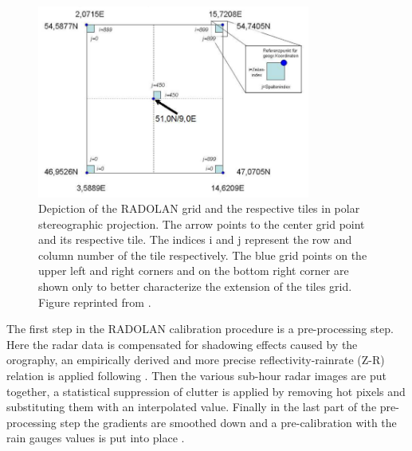 \begin{figure}[h!]
    \centering
    \includegraphics[width=0.8\textwidth]{grid.png}
    \caption{Depiction of the RADOLAN grid and the respective tiles in polar stereographic projection. The arrow points to the center grid point and its respective tile. The indices i and j represent the row and column number of the tile respectively. The blue grid points on the upper left and right corners and on the bottom right corner are shown only to better characterize the extension of the tiles grid. Figure reprinted from \citet{Weigl2021RADOLAN/RADVOR2.5.3}.}
    \label{fig:grid}
\end{figure}
 
The first step in the RADOLAN calibration procedure is a pre-processing step. Here the radar data is compensated for shadowing effects caused by the orography, an empirically derived and more precise reflectivity-rainrate (Z-R) relation is applied following \citet{Weigl2015RadarniederschlagNiederschlages}. Then the various sub-hour radar images are put together, a statistical suppression of clutter is applied by removing hot pixels and substituting them with an interpolated value. Finally in the last part of the pre-processing step the gradients are smoothed down and a pre-calibration with the rain gauges values is put into place \citep{Weigl2004ProjektOmbrometer}.

